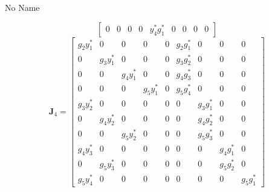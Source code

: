 \documentclass[a4paper,10pt]{article}
\begin{document}
\begin{section}{No Name}
\begin{landscape}
\begin{equation}
\begin{bmatrix}
0&0&0&0&y_4^*g_1^*&0&0&0&0
\end{bmatrix}
\end{equation}
\begin{equation}
\boldsymbol{J}_4 = 
\begin{bmatrix}
g_2y_1^*&0&0&0&0&g_2g_1^*&0&0&0\\
0&g_3y_1^*&0&0&0&g_3g_2^*&0&0&0\\
0&0&g_4y_1^*&0&0&g_4g_3^*&0&0&0\\
0&0&0&g_5y_1^*&0&g_5g_4^*&0&0&0\\
g_3y_2^*&0&0&0&0&0&g_3g_1^*&0&0\\
0&g_4y_2^*&0&0&0&0&g_4g_2^*&0&0\\
0&0&g_5y_2^*&0&0&0&g_5g_3^*&0&0\\
g_4y_3^*&0&0&0&0&0&0&g_4g_1^*&0\\
0&g_5y_3^*&0&0&0&0&0&g_5g_2^*&0\\
g_5y_4^*&0&0&0&0&0&0&0&g_5g_1^*
\end{bmatrix}
\end{equation}
\end{landscape}


\end{section}
\end{document}
